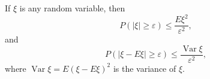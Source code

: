 If $\xi$ is any random variable, then
$$P(|\xi| \geq \varepsilon) \leq \frac{E\xi^2}{\varepsilon^2},$$
and
$$P(|\xi - E\xi| \geq \varepsilon) \leq \frac{\operatorname{Var} \xi}{\varepsilon^2},$$
where $\operatorname{Var} \xi = E(\xi - E\xi)^2$ is the variance of $\xi$.
